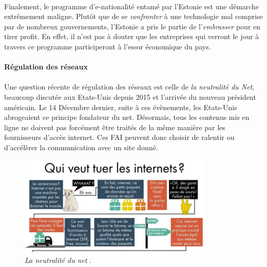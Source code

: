 \paragraph{} Finalement, le programme d'e-nationalité entamé par l'Estonie est une démarche extrêmement maligne. Plutôt
que de se \emph{confronter} à une technologie mal comprise par de nombreux gouvernements, l'Estonie a pris le partie de
l'\emph{embrasser} pour en tirer profit. En effet, il n'est pas à douter que les entreprises qui verront le jour à travers
ce programme participeront à l'essor économique du pays.

\paragraph{Régulation des réseaux}

\paragraph{} Une question récente de régulation des réseaux est celle de \emph{la neutralité du Net},
beaucoup discutée aux Etats-Unis depuis 2015 et l'arrivée du nouveau président américain. Le 14 Décembre
dernier, suite à ces évènements, les Etats-Unis abrogeaient ce principe fondateur du net. \cite{NetNeutrality0}
Désormais, tous les contenus mis en ligne ne doivent pas forcément être traités de la même manière par
les fournisseurs d'accès internet. Ces FAI peuvent donc choisir de ralentir ou d'accélèrer la communication
avec un site donné.

\begin{figure}[ht]
    \centering
    \includegraphics[width=350px]{chapters/02/images/internet_cats.jpg}
    \caption{\label{netneutrality}\emph{La neutralité du net} \cite{NetNeutrality1}.}
\end{figure}

